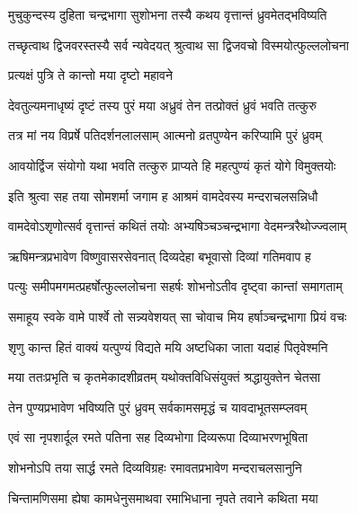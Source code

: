 \twolineshloka
{मुचुकुन्दस्य दुहिता चन्द्रभागा सुशोभना}
{तस्यै कथय वृत्तान्तं ध्रुवमेतद्भविष्यति} %

\twolineshloka
{तच्छृत्वाथ द्विजवरस्तस्यै सर्व न्यवेदयत्}
{श्रुत्वाथ सा द्विजवचो विस्मयोत्फुल्ललोचना} %



\onelineshloka
{प्रत्यक्षं पुत्रि ते कान्तो मया दृष्टो महावने} %

\twolineshloka
{देवतुल्यमनाधृष्यं दृष्टं तस्य पुरं मया}
{अध्रुवं तेन तत्प्रोक्तं ध्रुवं भवति तत्कुरु} %


\twolineshloka
{तत्र मां नय विप्रर्षे पतिदर्शनलालसाम्}
{आत्मनो व्रतपुण्येन करिप्यामि पुरं ध्रुवम्} %

\twolineshloka
{आवयोर्द्विज संयोगो यथा भवति तत्कुरु}
{प्राप्यते हि महत्पुण्यं कृतं योगे विमुक्तयोः} %

\twolineshloka
{इति श्रुत्वा सह तया सोमशर्मा जगाम ह}
{आश्रमं वामदेवस्य मन्दराचलसन्निधौ} %

\twolineshloka
{वामदेवोऽशृणोत्सर्व वृत्तान्तं कथितं तयोः}
{अभ्यषिञ्चञ्चन्द्रभागा वेदमन्त्ररैथोज्ज्वलाम्} %

\twolineshloka
{ऋषिमन्त्रप्रभावेण विष्णुवासरसेवनात्}
{दिव्यदेहा बभूवासो दिव्यां गतिमवाप ह} %

\twolineshloka
{पत्युः समीपमगमत्प्रहर्षोत्फुल्ललोचना}
{सहर्षः शोभनोऽतीव दृष्ट्वा कान्तां समागताम्} %

\twolineshloka
{समाहूय स्वके वामे पार्श्वे तो सन्न्यवेशयत्}
{सा चोवाच मिय हर्षाञ्चन्द्रभागा प्रियं वचः} %

\twolineshloka
{शृणु कान्त हितं वाक्यं यत्पुण्यं विद्यते मयि}
{अष्टधिका जाता यदाहं पितृवेश्मनि} %

\twolineshloka
{मया ततःप्रभृति च कृतमेकादशीव्रतम्}
{यथोक्तविधिसंयुक्तं श्रद्धायुक्तेन चेतसा} %

\twolineshloka
{तेन पुण्यप्रभावेण भविष्यति पुरं ध्रुवम्}
{सर्वकामसमृद्धं च यावदाभूतसम्प्लवम्} %

\twolineshloka
{एवं सा नृपशार्दूल रमते पतिना सह}
{दिव्यभोगा दिव्यरूपा दिव्याभरणभूषिता} %

\twolineshloka
{शोभनोऽपि तया सार्द्ध रमते दिव्यविग्रहः}
{रमावतप्रभावेण मन्दराचलसानुनि} %

\twolineshloka
{चिन्तामणिसमा ह्येषा कामधेनुसमाथवा}
{रमाभिधाना नृपते तवाने कथिता मया} %

